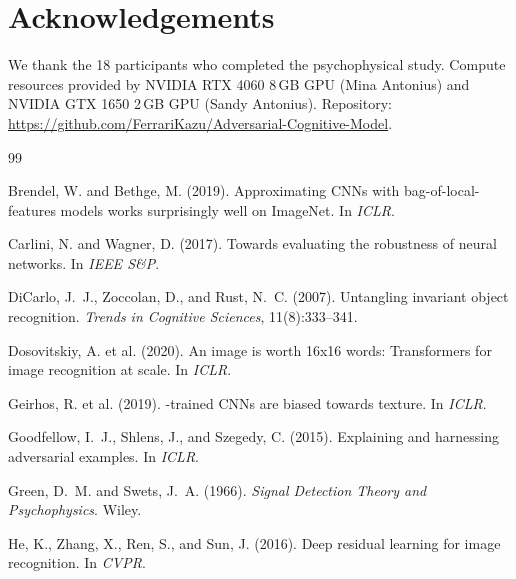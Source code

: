 \documentclass[12pt,a4paper]{article}
\begin{document}
\section*{Acknowledgements}

We thank the 18 participants who completed the psychophysical study.
Compute resources provided by NVIDIA RTX 4060 8\,GB GPU (Mina Antonius)
and NVIDIA GTX 1650 2\,GB GPU (Sandy Antonius).
Repository: \url{https://github.com/FerrariKazu/Adversarial-Cognitive-Model}.


\begin{thebibliography}{99}

Brendel, W. and Bethge, M. (2019).
\newblock Approximating {CNNs} with bag-of-local-features models works
  surprisingly well on {ImageNet}.
\newblock In \emph{ICLR}.

Carlini, N. and Wagner, D. (2017).
\newblock Towards evaluating the robustness of neural networks.
\newblock In \emph{IEEE S\&P}.

DiCarlo, J.~J., Zoccolan, D., and Rust, N.~C. (2007).
\newblock Untangling invariant object recognition.
\newblock \emph{Trends in Cognitive Sciences}, 11(8):333--341.

Dosovitskiy, A. et al. (2020).
\newblock An image is worth 16x16 words: Transformers for image recognition
  at scale.
\newblock In \emph{ICLR}.

Geirhos, R. et al. (2019).
-trained {CNNs} are biased towards texture.
\newblock In \emph{ICLR}.

Goodfellow, I.~J., Shlens, J., and Szegedy, C. (2015).
\newblock Explaining and harnessing adversarial examples.
\newblock In \emph{ICLR}.

Green, D.~M. and Swets, J.~A. (1966).
\newblock \emph{Signal Detection Theory and Psychophysics}.
\newblock Wiley.

He, K., Zhang, X., Ren, S., and Sun, J. (2016).
\newblock Deep residual learning for image recognition.
\newblock In \emph{CVPR}.


\end{thebibliography}
\end{document}
